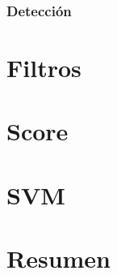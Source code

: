 \subsubsection{Detección}

\section{Filtros}
\label{subsec:fl}

\section{Score}
\label{subsec:score}

\section{SVM}
\section{Resumen}